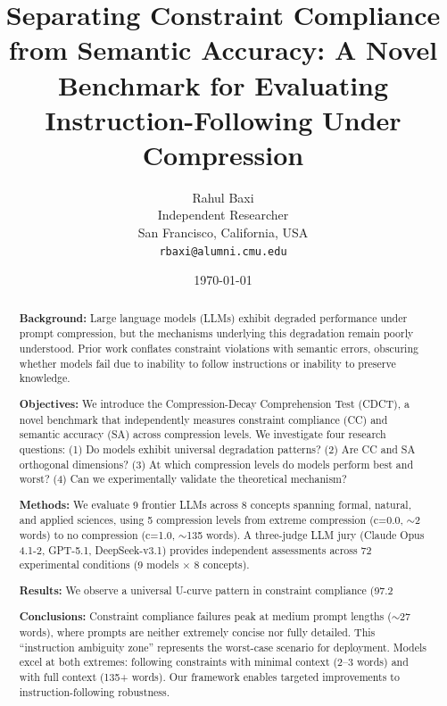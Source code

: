\documentclass[11pt]{article}
\title{Separating Constraint Compliance from Semantic Accuracy: A Novel Benchmark for Evaluating Instruction-Following Under Compression}
\author{
  Rahul Baxi \\
  Independent Researcher \\
  San Francisco, California, USA \\
  \texttt{rbaxi@alumni.cmu.edu}
}
\date{\today}
\begin{document}
\maketitle

\begin{abstract}
\textbf{Background:} Large language models (LLMs) exhibit degraded performance under prompt compression, but the mechanisms underlying this degradation remain poorly understood. Prior work conflates constraint violations with semantic errors, obscuring whether models fail due to inability to follow instructions or inability to preserve knowledge.

\textbf{Objectives:} We introduce the Compression-Decay Comprehension Test (CDCT), a novel benchmark that independently measures constraint compliance (CC) and semantic accuracy (SA) across compression levels. We investigate four research questions: (1) Do models exhibit universal degradation patterns? (2) Are CC and SA orthogonal dimensions? (3) At which compression levels do models perform best and worst? (4) Can we experimentally validate the theoretical mechanism?

\textbf{Methods:} We evaluate 9 frontier LLMs across 8 concepts spanning formal, natural, and applied sciences, using 5 compression levels from extreme compression (c=0.0, $\sim$2 words) to no compression (c=1.0, $\sim$135 words). A three-judge LLM jury (Claude Opus 4.1-2, GPT-5.1, DeepSeek-v3.1) provides independent assessments across 72 experimental conditions (9 models $\times$ 8 concepts).

\textbf{Results:} We observe a universal U-curve pattern in constraint compliance (97.2%

\textbf{Conclusions:} Constraint compliance failures peak at medium prompt lengths ($\sim$27 words), where prompts are neither extremely concise nor fully detailed. This ``instruction ambiguity zone'' represents the worst-case scenario for deployment. Models excel at both extremes: following constraints with minimal context (2--3 words) and with full context (135+ words). Our framework enables targeted improvements to instruction-following robustness.
\end{abstract}
\end{document}
